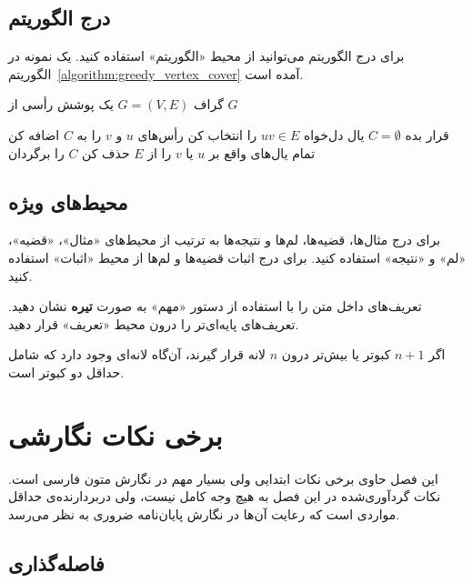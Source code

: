 \subsection{درج الگوریتم}

برای درج الگوریتم می‌توانید از محیط «الگوریتم» استفاده کنید.
یک نمونه در الگوریتم~\ref{algorithm:greedy_vertex_cover} آمده است.

\begin{algorithm}
\label{algorithm:greedy_vertex_cover}
\begin{algorithmic}[1]
\Require گراف $G=(V, E)$
\Ensure یک پوشش رأسی از $G$

\State قرار بده $C = \emptyset$  %
\State یال دل‌‌خواه $uv \in E$ را انتخاب کن
\State رأس‌های $u$ و $v$ را به $C$ اضافه کن
\State تمام یال‌های واقع بر $u$ یا $v$ را از $E$ حذف کن
\EndWhile
\State $C$ را برگردان
\end{algorithmic}
\end{algorithm}


\subsection{محیط‌های ویژه}

برای درج مثال‌ها، قضیه‌ها، لم‌ها و نتیجه‌ها به ترتیب از محیط‌های
«مثال»، «قضیه»، «لم» و «نتیجه» استفاده کنید.
برای درج اثبات قضیه‌ها و لم‌ها  از محیط «اثبات» استفاده کنید.

تعریف‌های داخل متن را با استفاده از دستور «مهم» به صورت \textbf{تیره‌} نشان دهید.
تعریف‌های پایه‌ای‌تر را درون محیط «تعریف» قرار دهید.

\begin{تعریف}
اگر $n+1$ کبوتر یا بیش‌تر درون  $n$ لانه قرار گیرند، آن‌گاه لانه‌ای 
وجود دارد که شامل حداقل دو کبوتر است.
\end{تعریف}




\section{برخی نکات نگارشی}

این فصل حاوی برخی نکات ابتدایی ولی بسیار مهم در نگارش متون فارسی است. 
نکات گردآوری‌شده در این فصل به‌ هیچ‌ وجه کامل نیست، 
ولی دربردارنده‌ی حداقل مواردی است که رعایت آن‌ها در نگارش پایان‌نامه ضروری به نظر می‌رسد.

\subsection{فاصله‌گذاری}

